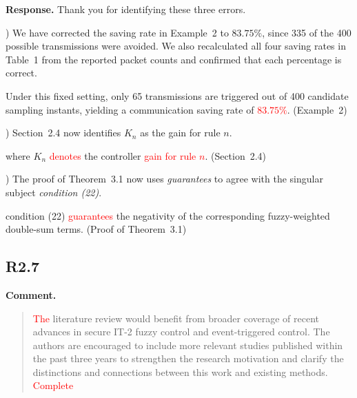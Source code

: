 \documentclass[12pt,a4paper]{article}
\begin{document}
\begingroup
\setlength{\parskip}{6pt}
\textbf{Response.}
Thank you for identifying these three errors.\par
{}) We have corrected the saving rate in Example~2 to $83.75\%$, since 335 of the 400 possible transmissions were avoided. We also recalculated all four saving rates in Table~1 from the reported packet counts and confirmed that each percentage is correct.\par\nopagebreak
\noindent Under this fixed setting, only 65 transmissions are triggered out of 400 candidate sampling instants, yielding a communication saving rate of \textcolor{red}{$83.75\%$}. (Example~2)\par
{}) Section~2.4 now identifies $K_n$ as the gain for rule $n$.\par\nopagebreak
\noindent where $K_n$ \textcolor{red}{denotes} the controller \textcolor{red}{gain for rule $n$}. (Section~2.4)\par
{}) The proof of Theorem~3.1 now uses \emph{guarantees} to agree with the singular subject \emph{condition (22)}.\par\nopagebreak
\noindent condition (22) \textcolor{red}{guarantees} the negativity of the corresponding fuzzy-weighted double-sum terms. (Proof of Theorem~3.1)\par
\endgroup

%
%

\subsection*{R2.7}

\textbf{Comment.}
\begin{quote}
\raggedright
\textcolor{red}{The} literature review would benefit from broader coverage of recent advances in secure IT-2 fuzzy control and event-triggered control. The authors are encouraged to include more relevant studies published within the past three years to strengthen the research motivation and clarify the distinctions and connections between this work and existing methods. \textcolor{red}{Complete}
\end{quote}
\end{document}
